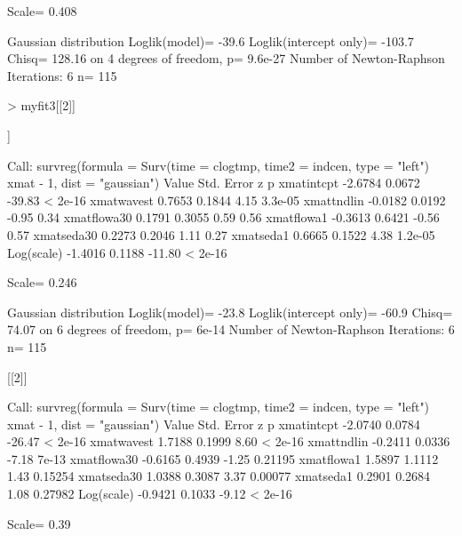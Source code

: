 \documentclass[11pt]{article}
\begin{document}
\begin{Schunk}
\begin{Soutput}
Scale= 0.408 

Gaussian distribution
Loglik(model)= -39.6   Loglik(intercept only)= -103.7
	Chisq= 128.16 on 4 degrees of freedom, p= 9.6e-27 
Number of Newton-Raphson Iterations: 6 
n= 115 
\end{Soutput}
\begin{Sinput}
> myfit3[[2]]
\end{Sinput}
\begin{Soutput}
[[1]]

Call:
survreg(formula = Surv(time = clogtmp, time2 = indcen, type = "left") ~ 
    xmat - 1, dist = "gaussian")
              Value Std. Error      z       p
xmatintcpt  -2.6784     0.0672 -39.83 < 2e-16
xmatwavest   0.7653     0.1844   4.15 3.3e-05
xmattndlin  -0.0182     0.0192  -0.95    0.34
xmatflowa30  0.1791     0.3055   0.59    0.56
xmatflowa1  -0.3613     0.6421  -0.56    0.57
xmatseda30   0.2273     0.2046   1.11    0.27
xmatseda1    0.6665     0.1522   4.38 1.2e-05
Log(scale)  -1.4016     0.1188 -11.80 < 2e-16

Scale= 0.246 

Gaussian distribution
Loglik(model)= -23.8   Loglik(intercept only)= -60.9
	Chisq= 74.07 on 6 degrees of freedom, p= 6e-14 
Number of Newton-Raphson Iterations: 6 
n= 115 


[[2]]

Call:
survreg(formula = Surv(time = clogtmp, time2 = indcen, type = "left") ~ 
    xmat - 1, dist = "gaussian")
              Value Std. Error      z       p
xmatintcpt  -2.0740     0.0784 -26.47 < 2e-16
xmatwavest   1.7188     0.1999   8.60 < 2e-16
xmattndlin  -0.2411     0.0336  -7.18   7e-13
xmatflowa30 -0.6165     0.4939  -1.25 0.21195
xmatflowa1   1.5897     1.1112   1.43 0.15254
xmatseda30   1.0388     0.3087   3.37 0.00077
xmatseda1    0.2901     0.2684   1.08 0.27982
Log(scale)  -0.9421     0.1033  -9.12 < 2e-16

Scale= 0.39 


\end{Soutput}
\end{Schunk}
\end{document}
